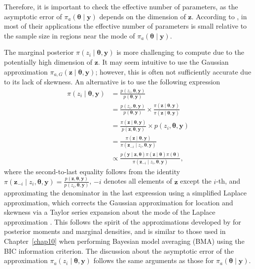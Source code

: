 Therefore, it is important to check the effective number of parameters, as the asymptotic error of $\pi_a(\boldsymbol{\theta} \mid \boldsymbol{y})$ depends on the dimension of $\boldsymbol{z}$. According to \cite{rue2009approximate}, in most of their applications the effective number of parameters is small relative to the sample size in regions near the mode of $\pi_a(\boldsymbol{\theta} \mid \boldsymbol{y})$. 

The marginal posterior $\pi(z_i \mid \boldsymbol{\theta}, \boldsymbol{y})$ is more challenging to compute due to the potentially high dimension of $\boldsymbol{z}$. It may seem intuitive to use the Gaussian approximation $\pi_{a,G}(\boldsymbol{z} \mid \boldsymbol{\theta}, \boldsymbol{y})$; however, this is often not sufficiently accurate due to its lack of skewness. An alternative is to use the following expression
\begin{align*}
	\pi(z_i\mid \boldsymbol{\theta},\boldsymbol{y})&=\frac{p(z_i,\boldsymbol{\theta},\boldsymbol{y})}{p(\boldsymbol{\theta},\boldsymbol{y})}\\
	&=\frac{p(z_i,\boldsymbol{\theta},\boldsymbol{y})}{p(\boldsymbol{\theta},\boldsymbol{y})}\times \frac{\pi(\boldsymbol{z}\mid\boldsymbol{\theta},\boldsymbol{y})}{\pi(\boldsymbol{z}\mid\boldsymbol{\theta},\boldsymbol{y})}\\
	&=\frac{\pi(\boldsymbol{z}\mid\boldsymbol{\theta},\boldsymbol{y})}{p(\boldsymbol{z},\boldsymbol{\theta},\boldsymbol{y})}\times p(z_i,\boldsymbol{\theta},\boldsymbol{y})\\
	&=\frac{\pi(\boldsymbol{z}\mid\boldsymbol{\theta},\boldsymbol{y})}{\pi(\boldsymbol{z}_{-i}\mid z_i,\boldsymbol{\theta},\boldsymbol{y})}\\
	&\propto \frac{p(\boldsymbol{y}\mid \boldsymbol{z},\boldsymbol{\theta})\pi(\boldsymbol{z}\mid\boldsymbol{\theta})\pi(\boldsymbol{\theta})}{\pi(\boldsymbol{z}_{-i}\mid z_i,\boldsymbol{\theta},\boldsymbol{y})}, 
\end{align*}
where the second-to-last equality follows from the identity $\pi(\boldsymbol{z}_{-i} \mid z_i, \boldsymbol{\theta}, \boldsymbol{y}) = \frac{p(\boldsymbol{z}, \boldsymbol{\theta}, \boldsymbol{y})}{p(z_i, \boldsymbol{\theta}, \boldsymbol{y})}$, $-i$ denotes all elements of $\boldsymbol{z}$ except the $i$-th, and approximating the denominator in the last expression using a simplified Laplace approximation, which corrects the Gaussian approximation for location and skewness via a Taylor series expansion about the mode of the Laplace approximation \cite{rue2009approximate}. This follows the spirit of the approximations developed by \cite{Tierney1986, tierney1989fully} for posterior moments and marginal densities, and is similar to those used in Chapter~\ref{chap10} when performing Bayesian model averaging (BMA) using the BIC information criterion. The discussion about the asymptotic error of the approximation $\pi_{a}(z_i \mid \boldsymbol{\theta}, \boldsymbol{y})$ follows the same arguments as those for $\pi_a(\boldsymbol{\theta} \mid \boldsymbol{y})$.

